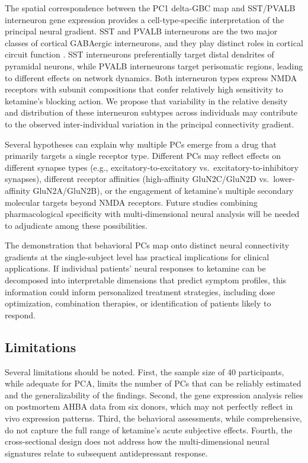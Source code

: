 \documentclass[12pt]{article}
\begin{document}
The spatial correspondence between the PC1 delta-GBC map and SST/PVALB interneuron gene expression provides a cell-type-specific interpretation of the principal neural gradient. SST and PVALB interneurons are the two major classes of cortical GABAergic interneurons, and they play distinct roles in cortical circuit function \citep{tremblay2016gabaergic}. SST interneurons preferentially target distal dendrites of pyramidal neurons, while PVALB interneurons target perisomatic regions, leading to different effects on network dynamics. Both interneuron types express NMDA receptors with subunit compositions that confer relatively high sensitivity to ketamine's blocking action. We propose that variability in the relative density and distribution of these interneuron subtypes across individuals may contribute to the observed inter-individual variation in the principal connectivity gradient.

Several hypotheses can explain why multiple PCs emerge from a drug that primarily targets a single receptor type. Different PCs may reflect effects on different synapse types (e.g., excitatory-to-excitatory vs.\ excitatory-to-inhibitory synapses), different receptor affinities (high-affinity GluN2C/GluN2D vs.\ lower-affinity GluN2A/GluN2B), or the engagement of ketamine's multiple secondary molecular targets beyond NMDA receptors. Future studies combining pharmacological specificity with multi-dimensional neural analysis will be needed to adjudicate among these possibilities.

The demonstration that behavioral PCs map onto distinct neural connectivity gradients at the single-subject level has practical implications for clinical applications. If individual patients' neural responses to ketamine can be decomposed into interpretable dimensions that predict symptom profiles, this information could inform personalized treatment strategies, including dose optimization, combination therapies, or identification of patients likely to respond.

\subsection{Limitations}

Several limitations should be noted. First, the sample size of 40 participants, while adequate for PCA, limits the number of PCs that can be reliably estimated and the generalizability of the findings. Second, the gene expression analysis relies on postmortem AHBA data from six donors, which may not perfectly reflect in vivo expression patterns. Third, the behavioral assessments, while comprehensive, do not capture the full range of ketamine's acute subjective effects. Fourth, the cross-sectional design does not address how the multi-dimensional neural signatures relate to subsequent antidepressant response.
\end{document}
